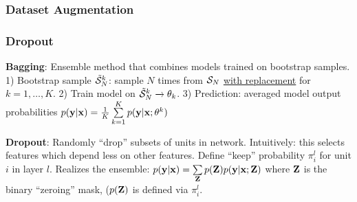     
    \subsubsection{Dataset Augmentation}
    \label{ssub:datasetaugmentation}
    
    \subsubsection{Dropout}
    \label{ssub:dropout}
    \textbf{Bagging}: Ensemble method that combines models trained on bootstrap samples. 1) Bootstrap sample $\Tilde{\mathcal{S}}^k_N$: sample $N$ times from $\mathcal{S}_N$ \underline{with replacement} for $k=1,\ldots,K$. 2) Train model on $\Tilde{\mathcal{S}}^k_N\xrightarrow{}\theta_k$. 3) Prediction: averaged model output probabilities $p(\mathbf y|\mathbf x)=\frac{1}{K}\sum\limits^K_{k=1}p(\mathbf y|\mathbf x;\theta^k)$
    
    \textbf{Dropout}: Randomly ``drop'' subsets of units in network. Intuitively: this selects features which depend less on other features. Define ``keep'' probability $\pi^l_i$ for unit $i$ in layer $l$. Realizes the ensemble: $p(\mathbf y|\mathbf x)=\sum\limits_\mathbf Z p(\mathbf Z)p(\mathbf y|\mathbf x;\mathbf Z)$ where $\mathbf Z$ is the binary ``zeroing'' mask, ($p(\mathbf Z)$ is defined via $\pi^l_i$.
    
    
